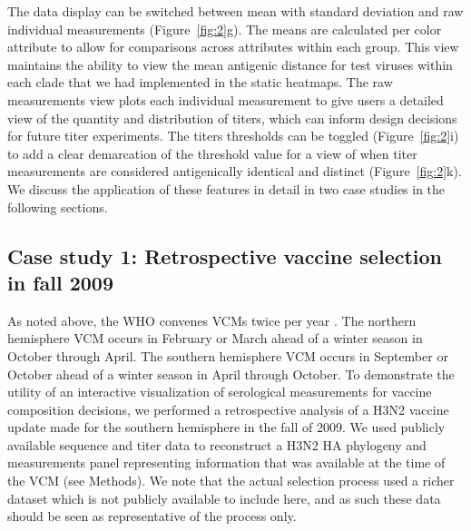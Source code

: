 \documentclass[utf8]{FrontiersinHarvard} %
\begin{document}
The data display can be switched between mean with standard deviation and raw individual measurements (Figure~\ref{fig:2}g).
The means are calculated per color attribute to allow for comparisons across attributes within each group.
This view maintains the ability to view the mean antigenic distance for test viruses within each clade that we had implemented in the static heatmaps.
The raw measurements view plots each individual measurement to give users a detailed view of the quantity and distribution of titers, which can inform design decisions for future titer experiments.
The titers thresholds can be toggled (Figure~\ref{fig:2}i) to add a clear demarcation of the threshold value for a view of when titer measurements are considered antigenically identical and distinct (Figure~\ref{fig:2}k).
We discuss the application of these features in detail in two case studies in the following sections.

\subsection{Case study 1: Retrospective vaccine selection in fall 2009}

As noted above, the WHO convenes VCMs twice per year \citep{Morris:2017ea}.
The northern hemisphere VCM occurs in February or March ahead of a winter season in October through April.
The southern hemisphere VCM occurs in September or October ahead of a winter season in April through October.
To demonstrate the utility of an interactive visualization of serological measurements for vaccine composition decisions, we performed a retrospective analysis of a H3N2 vaccine update made for the southern hemisphere in the fall of 2009.
We used publicly available sequence and titer data \citep{Bedford:2014bf} to reconstruct a H3N2 HA phylogeny and measurements panel representing information that was available at the time of the VCM (see Methods).
We note that the actual selection process used a richer dataset which is not publicly available to include here, and as such these data should be seen as representative of the process only.
\end{document}
